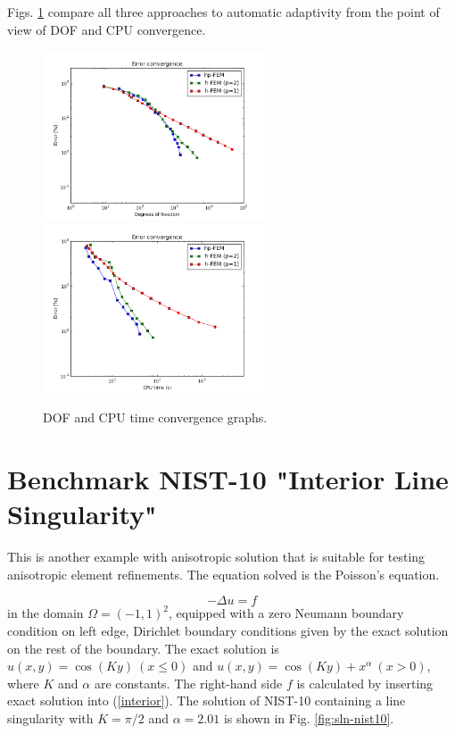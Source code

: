 \documentclass[12pt]{elsarticle}
\begin{document}
Figs. \ref{fig:nist-9-conv} compare all
three approaches to automatic adaptivity from the point
of view of DOF and CPU convergence.

\begin{figure}[!ht]
\centering
\includegraphics[height=5cm]{nist/nist-9/conv_dof_aniso.png}\ \
\includegraphics[height=5cm]{nist/nist-9/conv_cpu_aniso.png}
\caption{DOF and CPU time convergence graphs.}
\label{fig:nist-9-conv}
\end{figure}




\section{Benchmark NIST-10 "Interior Line Singularity"}
\label{sec:bench-10}

This is another example with anisotropic solution that is suitable for testing
anisotropic element refinements. The equation solved is the Poisson's equation.

\begin{equation} \label{interior}
-\Delta u = f
\end{equation}
in the domain $\Omega = (-1, 1)^2$, equipped with a zero
Neumann boundary condition on left edge, Dirichlet boundary
conditions given by the exact solution on the rest of the boundary.
The exact solution is
$u(x,y) = \cos(Ky)\ (x \le 0)$ and $u(x,y) = \cos(Ky) + x^{\alpha}\ (x > 0)$,
where $K$ and $\alpha$ are constants.
The right-hand side $f$ is calculated by inserting exact solution into (\ref{interior}).
The solution of NIST-10 containing a line singularity with $K = \pi/2$ and
$\alpha = 2.01$ is shown in Fig. \ref{fig:sln-nist10}.
\end{document}
